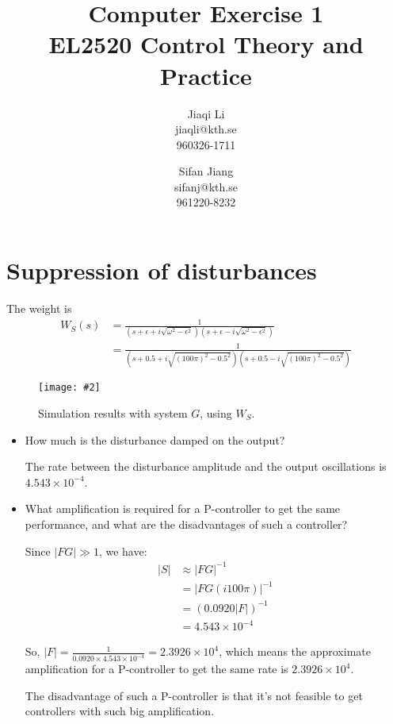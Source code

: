 \documentclass[11pt,a4paper]{article}
\title{
	Computer Exercise 1\\
	EL2520 Control Theory and Practice
}
\author{
	Jiaqi Li\\
	jiaqli@kth.se\\
	960326-1711
	\and
	Sifan Jiang\\
	sifanj@kth.se\\
	961220-8232
}
\newcommand{\image}[3]{
	\begin{figure}[!ht]
		\centering
	    \texttt{[image: \#2]}
		\caption{#3}
		\label{fig:#2}
	\end{figure}
}
\begin{document}
\maketitle


\section*{Suppression of disturbances}
\par The weight is
	\begin{align*}
		W_S(s) &= \frac{1}{(s+\epsilon+i\sqrt{\omega^{2}-\epsilon^{2}})(s+\epsilon-i\sqrt{\omega^{2}-\epsilon^{2}})} \\
		&= \frac{1}{(s+0.5+i\sqrt{(100\pi)^{2}-0.5^{2}})(s+0.5-i\sqrt{(100\pi)^{2}-0.5^{2}})}
	\end{align*}

	\image{0.85}{41}{Simulation results with system $G$, using $W_S$.}
	
	\begin{itemize}
		\item How much is the disturbance damped on the output?
		\par The rate between the disturbance amplitude and the output oscillations is $4.543\times 10^{-4}$.

		\item What amplification is required for a P-controller to get the same performance, and what are the disadvantages of such a controller?
		\par Since $|FG| \gg 1$, we have:
			\begin{align*}
				|S| &\approx |FG|^{-1} \\
				&= |FG(i 100\pi)|^{-1} \\
				&= (0.0920|F|)^{-1} \\
				&= 4.543\times 10^{-4}
			\end{align*}
		\par So, $|F|=\frac{1}{0.0920\times4.543\times 10^{-4}}=2.3926\times10^{4}$, which means the approximate amplification for a P-controller to get the same rate is $2.3926\times10^{4}$.
		\par The disadvantage of such a P-controller is that it's not feasible to get controllers with such big amplification.
	\end{itemize}


\end{document}
